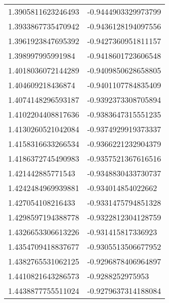 \begin{supertabular}{ll}
1.3905811623246493  & -0.9444903329973799   \\
1.3933867735470942  & -0.9436128194097556   \\
1.3961923847695392  & -0.9427360951811157   \\
1.398997995991984   & -0.9418601723606548   \\
1.4018036072144289  & -0.9409850628658805   \\
1.404609218436874   & -0.9401107784835409   \\
1.4074148296593187  & -0.9392373308705894   \\
1.4102204408817636  & -0.9383647315551235   \\
1.4130260521042084  & -0.9374929919373337   \\
1.4158316633266534  & -0.9366221232904379   \\
1.4186372745490983  & -0.9357521367616516   \\
1.421442885771543   & -0.9348830433730737   \\
1.4242484969939881  & -0.934014854022662    \\
1.427054108216433   & -0.9331475794851328   \\
1.4298597194388778  & -0.9322812304128759   \\
1.4326653306613226  & -0.931415817336923    \\
1.4354709418837677  & -0.9305513506677952   \\
1.4382765531062125  & -0.9296878406964897   \\
1.4410821643286573  & -0.9288252975953      \\
1.4438877755511024  & -0.9279637314188084   \\
\end{supertabular}
